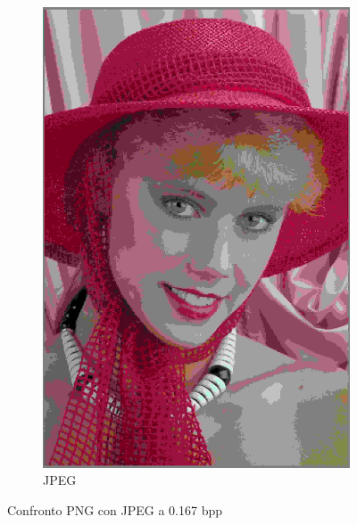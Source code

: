 \begin{figure}[h!]
\begin{subfigure}[]{0.3\textwidth}
        \includegraphics[width=\textwidth]{Immagini/IMAGES/JPEG_1_IMG0004.pdf}
        \caption{JPEG}
        \label{fig:CompressedJPEG}
    \end{subfigure}
    \caption{Confronto PNG con JPEG a 0.167 bpp}
    \label{fig:CompressionJPEG}
\end{figure}

